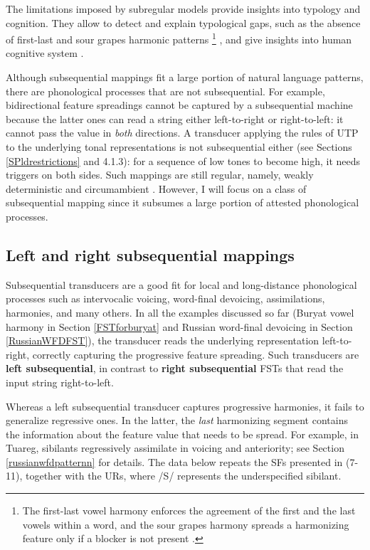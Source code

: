 The limitations imposed by subregular models provide insights into typology and cognition.
They allow to detect and explain typological gaps, such as the absence of first-last and sour grapes harmonic patterns%
\footnote{The first-last vowel harmony enforces the agreement of the first and the last vowels within a word, and the sour grapes harmony spreads a harmonizing feature only if a blocker is not present \citep{Heinz-Lai-2013-VHS}.}
 \citep{Heinz-Lai-2013-VHS,Luo2017}, and give insights into human cognitive system \citep{RogersPullum2011,Lai15,Avcu2017Experiment}.


Although subsequential mappings fit a large portion of natural language patterns, there are phonological processes that are not subsequential.
For example, bidirectional feature spreadings cannot be captured by a subsequential machine because the latter ones can read a string either left-to-right or right-to-left: it cannot pass the value in \emph{both} directions.
A transducer applying the rules of UTP to the underlying tonal representations is not subsequential either (see Sections \ref{SPldrestrictions} and 4.1.3): for a sequence of low tones to become high, it needs triggers on both sides.
Such mappings are still regular, namely, weakly deterministic and circumambient \citep{Heinz-Lai-2013-VHS,Jardine2016,LamontEtAl2019}.
However, I will focus on a class of subsequential mapping since it subsumes a large portion of attested phonological processes.





\subsection{Left and right subsequential mappings}


Subsequential transducers are a good fit for local and long-distance phonological processes such as intervocalic voicing, word-final devoicing, assimilations, harmonies, and many others.
In all the examples discussed so far (Buryat vowel harmony in Section \ref{FSTforburyat} and Russian word-final devoicing in Section \ref{RussianWFDFST}), the transducer reads the underlying representation left-to-right, correctly capturing the progressive feature spreading.
Such transducers are \textbf{left subsequential}, in contrast to \textbf{right subsequential} FSTs that read the input string right-to-left.

Whereas a left subsequential transducer captures progressive harmonies, it fails to generalize regressive ones.
In the latter, the \emph{last} harmonizing segment contains the information about the feature value that needs to be spread.
For example, in Tuareg, sibilants regressively assimilate in voicing and anteriority; see Section \ref{russianwfdpatternn} for details.
The data below repeats the SFs presented in (7-11), together with the URs, where /S/ represents the underspecified sibilant.


